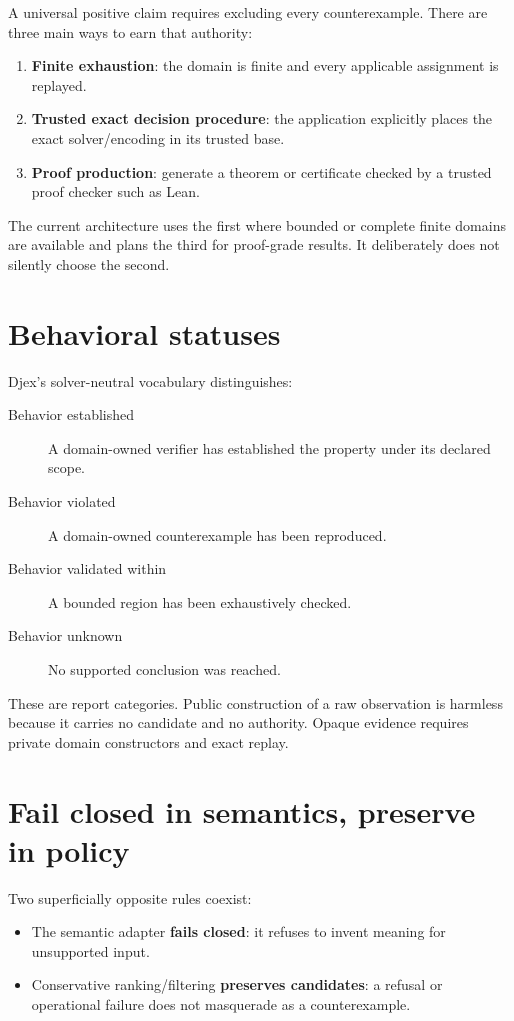 \documentclass[10pt,letterpaper,oneside]{report}
\newcommand{\term}[1]{\textbf{#1}}
\begin{document}
A universal positive claim requires excluding every counterexample. There are three main ways to earn that authority:

\begin{enumerate}
\item \term{Finite exhaustion}: the domain is finite and every applicable assignment is replayed.
\item \term{Trusted exact decision procedure}: the application explicitly places the exact solver/encoding in its trusted base.
\item \term{Proof production}: generate a theorem or certificate checked by a trusted proof checker such as Lean.
\end{enumerate}

The current architecture uses the first where bounded or complete finite domains are available and plans the third for proof-grade results. It deliberately does not silently choose the second.

\section{Behavioral statuses}

Djex's solver-neutral vocabulary distinguishes:

\begin{description}
\item[Behavior established] A domain-owned verifier has established the property under its declared scope.
\item[Behavior violated] A domain-owned counterexample has been reproduced.
\item[Behavior validated within] A bounded region has been exhaustively checked.
\item[Behavior unknown] No supported conclusion was reached.
\end{description}

These are report categories. Public construction of a raw observation is harmless because it carries no candidate and no authority. Opaque evidence requires private domain constructors and exact replay.

\section{Fail closed in semantics, preserve in policy}

Two superficially opposite rules coexist:

\begin{itemize}
\item The semantic adapter \term{fails closed}: it refuses to invent meaning for unsupported input.
\item Conservative ranking/filtering \term{preserves candidates}: a refusal or operational failure does not masquerade as a counterexample.
\end{itemize}
\end{document}
